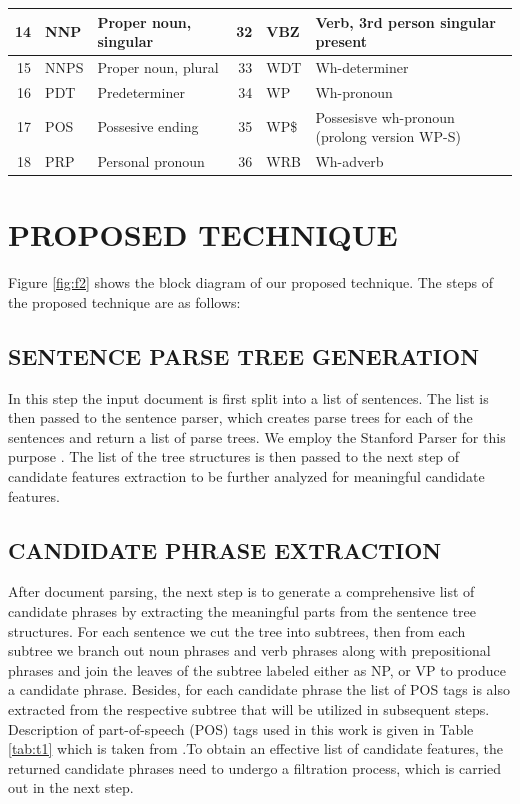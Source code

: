 \documentclass{ieeeaccess}
\begin{document}
\begin{table}[!h]
\begin{tabular}{|r|l|l|r|l|l|}
\hline
14    & NNP     & Proper noun, singular                    & 32    & VBZ     & Verb, 3rd person singular present             \\ 
\hline
15    & NNPS    & Proper noun, plural                      & 33    & WDT     & Wh-determiner                                 \\ 
\hline
16    & PDT     & Predeterminer                            & 34    & WP      & Wh-pronoun                                    \\ 
\hline
17    & POS     & Possesive ending                         & 35    & WP\$    & Possesisve wh-pronoun (prolong version WP-S)  \\ 
\hline
18    & PRP     & Personal pronoun                         & 36    & WRB     & Wh-adverb                                     \\
\hline
\end{tabular}
\end{table}

\section{PROPOSED TECHNIQUE}
Figure \ref{fig:f2} shows the block diagram of our proposed technique. The steps of the proposed technique are as follows:

\subsection{SENTENCE PARSE TREE GENERATION}
In this step the input document is first split into a list of sentences. The list is then passed to the sentence parser, which creates parse trees for each of the sentences and return a list of parse trees. We employ the Stanford Parser for this purpose \cite{b29}. The list of the tree structures is then passed to the next step of candidate features extraction to be further analyzed for meaningful candidate features.

\subsection{CANDIDATE PHRASE EXTRACTION}
After document parsing, the next step is to generate a comprehensive list of candidate phrases by extracting the  meaningful parts from the sentence tree structures. For each sentence we cut the tree into subtrees, then from each subtree we branch out noun phrases and verb phrases along with prepositional phrases and join the leaves of the subtree labeled either as NP, or VP to produce a candidate phrase. Besides, for each candidate phrase the list of POS tags is   also extracted from the respective subtree that will be utilized in subsequent steps. Description of part-of-speech (POS) tags used in this work is given in Table \ref{tab:t1} which is taken from \cite{b30}.To obtain an effective list of candidate features, the returned candidate phrases need to undergo a filtration process, which is carried out in the next step.
\end{document}
